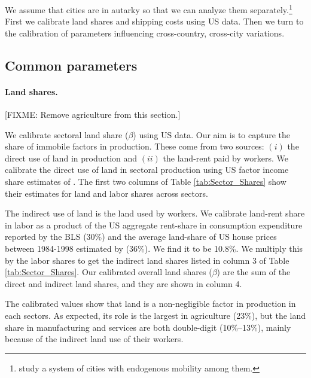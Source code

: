 \documentclass[12pt]{article}
\begin{document}
We assume that cities are in autarky so that we can analyze them separately.\footnote{ study a system of cities with endogenous mobility among them.} First we calibrate land shares and shipping costs using US data. Then we turn to the calibration of parameters influencing cross-country, cross-city variations.

\subsection{Common parameters}
\paragraph{Land shares.}
[FIXME: Remove agriculture from this section.]

We calibrate sectoral land share ($\beta$) using US data. Our aim is to capture the share of immobile factors in production. These come from two sources: $(i)$ the direct use of land in production and $(ii)$ the land-rent paid by workers. We calibrate the direct use of land in sectoral production using US factor income share estimates of . The first two columns of Table \ref{tab:Sector_Shares} show their estimates for land and labor shares across sectors.

The indirect use of land is the land used by workers. We calibrate land-rent share in labor as a product of the US aggregate rent-share in consumption expenditure reported by the BLS ($30\%$) and the average land-share of US house prices between 1984-1998 estimated by  (36\%). We find it to be 10.8\%. We multiply this by the labor shares to get the indirect land shares listed in column 3 of Table \ref{tab:Sector_Shares}. Our calibrated overall land shares ($\beta$) are the sum of the direct and indirect land shares, and they are shown in column 4.

The calibrated values show that land is a non-negligible factor in production in each sectors. As expected, its role is the largest in agriculture (23\%), but the land share in manufacturing and services are both double-digit (10\%--13\%), mainly because of the indirect land use of their workers.
\end{document}
